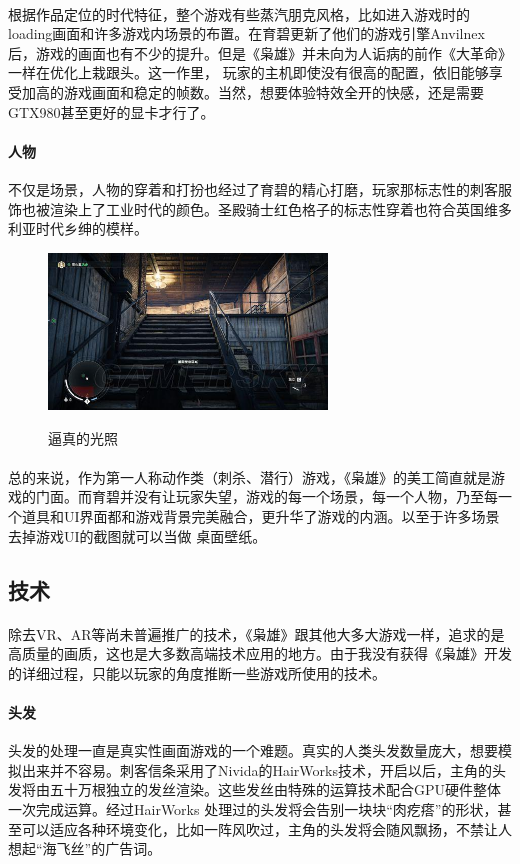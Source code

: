 \documentclass{article} \usepackage{CJK}
\begin{document}
\paragraph{}
根据作品定位的时代特征，整个游戏有些蒸汽朋克风格，比如进入游戏时的loading画面和许多游戏内场景的布置。在育碧更新了他们的游戏引擎Anvilnex后，游戏的画面也有不少的提升。但是《枭雄》并未向为人诟病的前作《大革命》一样在优化上栽跟头。这一作里，
玩家的主机即使没有很高的配置，依旧能够享受加高的游戏画面和稳定的帧数。当然，想要体验特效全开的快感，还是需要GTX980甚至更好的显卡才行了。
\paragraph{人物}
不仅是场景，人物的穿着和打扮也经过了育碧的精心打磨，玩家那标志性的刺客服饰也被渲染上了工业时代的颜色。圣殿骑士红色格子的标志性穿着也符合英国维多利亚时代乡绅的模样。
\begin{figure}[!h]
  \centering
  \includegraphics[width=20em]{scene1.jpg}\\
  \caption{逼真的光照}\label{2-1}
\end{figure}
\paragraph{}
总的来说，作为第一人称动作类（刺杀、潜行）游戏，《枭雄》的美工简直就是游戏的门面。而育碧并没有让玩家失望，游戏的每一个场景，每一个人物，乃至每一个道具和UI界面都和游戏背景完美融合，更升华了游戏的内涵。以至于许多场景去掉游戏UI的截图就可以当做
桌面壁纸。
\subsection{技术}
\paragraph{}
除去VR、AR等尚未普遍推广的技术，《枭雄》跟其他大多大游戏一样，追求的是高质量的画质，这也是大多数高端技术应用的地方。由于我没有获得《枭雄》开发的详细过程，只能以玩家的角度推断一些游戏所使用的技术。
\paragraph{头发}
头发的处理一直是真实性画面游戏的一个难题。真实的人类头发数量庞大，想要模拟出来并不容易。刺客信条采用了Nivida的HairWorks技术，开启以后，主角的头发将由五十万根独立的发丝渲染。这些发丝由特殊的运算技术配合GPU硬件整体一次完成运算。经过HairWorks
处理过的头发将会告别一块块“肉疙瘩”的形状，甚至可以适应各种环境变化，比如一阵风吹过，主角的头发将会随风飘扬，不禁让人想起“海飞丝”的广告词。
\end{document}
